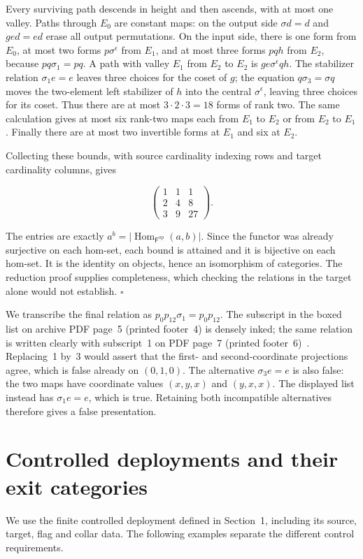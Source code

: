 \documentclass[11pt,a4paper]{article}
\theoremstyle{definition}
\begin{document}
Every surviving path descends in height and then ascends, with at most
one valley. Paths through \(E_0\) are constant maps: on the output side
\(\sigma d=d\) and \(ged=ed\) erase all output permutations. On the
input side, there is one form from \(E_0\), at most two forms
\(p\sigma^\epsilon\) from \(E_1\), and at most three forms \(pqh\) from
\(E_2\), because \(pq\sigma_1=pq\). A path with valley \(E_1\) from
\(E_2\) to \(E_2\) is \(ge\sigma^\epsilon qh\). The stabilizer relation
\(\sigma_1e=e\) leaves three choices for the coset of \(g\); the
equation \(q\sigma_3=\sigma q\) moves the two-element left stabilizer of
\(h\) into the central \(\sigma^\epsilon\), leaving three choices for
its coset. Thus there are at most \(3\cdot2\cdot3=18\) forms of rank
two. The same calculation gives at most six rank-two maps each from
\(E_1\) to \(E_2\) or from \(E_2\) to \(E_1\). Finally there are at most
two invertible forms at \(E_1\) and six at \(E_2\).

Collecting these bounds, with source cardinality indexing rows and
target cardinality columns, gives

\[\begin{pmatrix}1&1&1\\2&4&8\\3&9&27\end{pmatrix}.\]

The entries are exactly
\(a^b=|\operatorname{Hom}_{\mathsf F^{\mathrm{op}}}(a,b)|\). Since the
functor was already surjective on each hom-set, each bound is attained
and it is bijective on each hom-set. It is the identity on objects,
hence an isomorphism of categories. The reduction proof supplies completeness, which checking the
relations in the target alone would not establish. \(\square\)

We transcribe the final relation as
\(p_0p_{12}\sigma_1=p_0p_{12}\). The subscript in the boxed list on
archive PDF page~5 (printed footer~4) is densely inked; the same
relation is written clearly with subscript~1 on PDF page~7 (printed
footer~6)~\cite{Groth}. Replacing~1 by~3 would assert that the first-
and second-coordinate projections agree, which is false already on
\((0,1,0)\). The alternative \(\sigma_3e=e\) is also false: the two
maps have coordinate values \((x,y,x)\) and \((y,x,x)\). The displayed
list instead has \(\sigma_1e=e\), which is true. Retaining both
incompatible alternatives therefore gives a false presentation.

\section{Controlled deployments and their exit categories}\label{sec:deployment}
We use the finite controlled deployment defined in Section~1, including its source, target, flag and collar data. The following examples separate the different control requirements.
\end{document}
